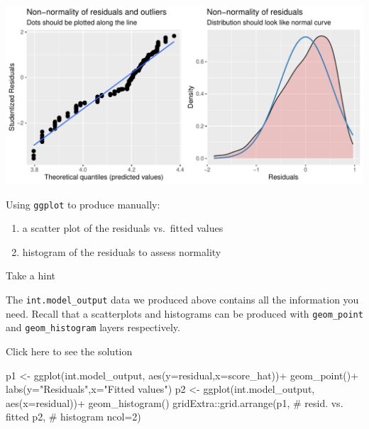 \documentclass[
  letterpaper,
  DIV=11,
  numbers=noendperiod]{scrartcl}
\newenvironment{Shaded}{\begin{snugshade}}{\end{snugshade}}
\newcommand{\AttributeTok}[1]{\textcolor[rgb]{0.40,0.45,0.13}{#1}}
\newcommand{\CommentTok}[1]{\textcolor[rgb]{0.37,0.37,0.37}{#1}}
\newcommand{\DecValTok}[1]{\textcolor[rgb]{0.68,0.00,0.00}{#1}}
\newcommand{\FunctionTok}[1]{\textcolor[rgb]{0.28,0.35,0.67}{#1}}
\newcommand{\NormalTok}[1]{\textcolor[rgb]{0.00,0.23,0.31}{#1}}
\newcommand{\OtherTok}[1]{\textcolor[rgb]{0.00,0.23,0.31}{#1}}
\newcommand{\SpecialCharTok}[1]{\textcolor[rgb]{0.37,0.37,0.37}{#1}}
\newcommand{\StringTok}[1]{\textcolor[rgb]{0.13,0.47,0.30}{#1}}
\providecommand{\tightlist}{%
  \setlength{\itemsep}{0pt}\setlength{\parskip}{0pt}}\usepackage{longtable,booktabs,array}
\begin{document}
\begin{center}
\includegraphics{notes_files/figure-pdf/unnamed-chunk-15-1.pdf}
\end{center}

\begin{tcolorbox}[enhanced jigsaw, coltitle=black, bottomtitle=1mm, arc=.35mm, colframe=quarto-callout-warning-color-frame, left=2mm, opacityback=0, colback=white, title={Task 2}, toptitle=1mm, titlerule=0mm, breakable, rightrule=.15mm, bottomrule=.15mm, toprule=.15mm, colbacktitle=quarto-callout-warning-color!10!white, leftrule=.75mm, opacitybacktitle=0.6]

Using \texttt{ggplot} to produce manually:

\begin{enumerate}
\def\labelenumi{\arabic{enumi}.}
\tightlist
\item
  a scatter plot of the residuals vs.~fitted values
\item
  histogram of the residuals to assess normality
\end{enumerate}

Take a hint

The \texttt{int.model\_output} data we produced above contains all the
information you need. Recall that a scatterplots and histograms can be
produced with \texttt{geom\_point} and \texttt{geom\_histogram} layers
respectively.

Click here to see the solution

\begin{Shaded}
\begin{Highlighting}[]
\NormalTok{p1 }\OtherTok{\textless{}{-}} \FunctionTok{ggplot}\NormalTok{(int.model\_output,}
             \FunctionTok{aes}\NormalTok{(}\AttributeTok{y=}\NormalTok{residual,}\AttributeTok{x=}\NormalTok{score\_hat))}\SpecialCharTok{+}
  \FunctionTok{geom\_point}\NormalTok{()}\SpecialCharTok{+}
  \FunctionTok{labs}\NormalTok{(}\AttributeTok{y=}\StringTok{"Residuals"}\NormalTok{,}\AttributeTok{x=}\StringTok{"Fitted values"}\NormalTok{)}
\NormalTok{p2 }\OtherTok{\textless{}{-}} \FunctionTok{ggplot}\NormalTok{(int.model\_output,}
             \FunctionTok{aes}\NormalTok{(}\AttributeTok{x=}\NormalTok{residual))}\SpecialCharTok{+}
  \FunctionTok{geom\_histogram}\NormalTok{()}
\NormalTok{gridExtra}\SpecialCharTok{::}\FunctionTok{grid.arrange}\NormalTok{(p1, }\CommentTok{\# resid. vs. fitted}
\NormalTok{                        p2, }\CommentTok{\# histogram}
                        \AttributeTok{ncol=}\DecValTok{2}\NormalTok{)}
\end{Highlighting}
\end{Shaded}


\end{tcolorbox}
\end{document}
